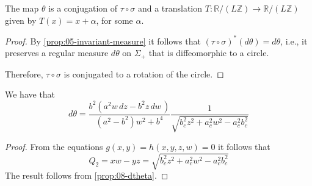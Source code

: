 \begin{theorem}
The map $\theta $ is a conjugation of $\tau\circ \sigma$ and a translation $T:\mathbb{R}/(L\mathbb{Z})\to \mathbb{R}/(L\mathbb{Z})$ given by $T(x)=x+\alpha$, for some $\alpha$.
\label{thm:05-rotation-cirle}
\end{theorem}

\begin{proof}
By \cref{prop:05-invariant-measure} it follows that $(\tau\circ \sigma)^{*}(d\theta)=d\theta$, i.e., it preserves a regular measure $d\theta$ on $\Sigma_+$ that is diffeomorphic to a circle. 

 

Therefore, $\tau\circ\sigma$ is conjugated to a rotation of the circle.
\end{proof}


 

 
 
 
 
 \begin{proposition}
 We have that
 \[d\theta={\frac {{b}^{2} \left( {a}^{2}{  w\,dz} -{b}^{2}{ z\, dw}\, 
 \right) }{ ({a}^{2}-b^2)w^2+{b}^{4} }{\frac {1}{\sqrt {
b_c^{2}z^{2} + a_c^2 {w}^{2}  -a_c^2b_c^{2}      }}}}\]

 
 \end{proposition}
 \begin{proof}
 From the equations $g(x,y)=h(x,y,z,w)=0$ it follows that
 \[ Q_2=xw-yz=\sqrt{ b_c^2 z^2+  a_c^2 w^2      -a_c^2 b_c^2}  \]
 The result follows from \cref{prop:08-dtheta}.
 \end{proof}
 
